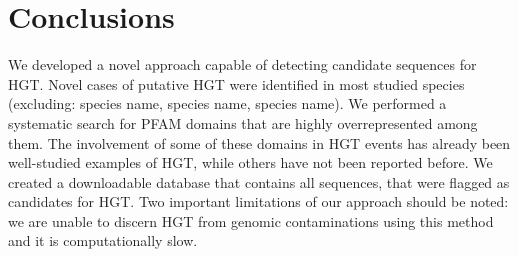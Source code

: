 \section{Conclusions}
We developed a novel approach capable of detecting candidate sequences for HGT.
Novel cases of putative HGT were identified in most studied species (excluding:
species name, species name, species name). We performed a systematic search for
PFAM domains that are highly overrepresented among them. The involvement of
some of these domains in HGT events has already been well-studied examples
of HGT, while others have not been reported before. We created a downloadable
database that contains all sequences, that were flagged as candidates for HGT.
Two important limitations of our approach should be noted: we are unable to
discern HGT from genomic contaminations using this method and it is
computationally slow.

